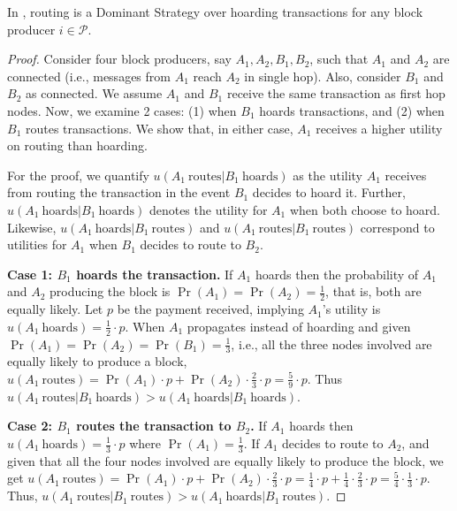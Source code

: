 \begin{lemma}\label{lemma:routing}
    In \ourTFM, routing is a Dominant Strategy over hoarding transactions for any block producer $i\in\mathcal{P}$. 
\end{lemma} 
\begin{proof}

    Consider four block producers, say $A_{1}, A_{2}, B_{1}, B_{2}$, such that $A_{1}$ and $A_{2}$ are connected (i.e., messages from $A_{1}$ reach $A_{2}$ in single hop). Also, consider $B_{1}$ and $B_{2}$ as connected. We assume $A_1$ and $B_1$ receive the same transaction as first hop nodes. Now, we examine 2 cases: (1) when $B_{1}$ hoards transactions, and (2) when $B_{1}$ routes transactions. We show that, in either case, $A_{1}$ receives a higher utility on routing than hoarding.
    
    For the proof, we quantify $u(A_1\ \mbox{routes} | B_1\ \mbox{hoards})$ as the utility $A_1$ receives from routing the transaction in the event $B_1$ decides to hoard it. Further, $u(A_1\ \mbox{hoards} | B_1\ \mbox{hoards})$ denotes the utility for $A_1$ when both choose to hoard. Likewise, $u(A_1\ \mbox{hoards} | B_1\ \mbox{routes})$ and $u(A_1\ \mbox{routes} | B_1\ \mbox{routes})$ correspond to utilities for $A_1$  when $B_1$ decides to route to $B_2$.
    \smallskip

    \noindent \textbf{Case 1: $B_1$ hoards the transaction.} If $A_1$ hoards then the probability of $A_1$ and $A_2$ producing the block is $\Pr(A_1) = \Pr(A_2) = \frac{1}{2}$, that is, both are equally likely. Let $p$ be the payment received, implying $A_1$'s utility is $u(A_1\ \mbox{hoards}) = \frac{1}{2}\cdot p$. When $A_1$ propagates instead of hoarding and given $\Pr(A_1) = \Pr(A_2) = \Pr(B_1) = \frac{1}{3}$, i.e., all the three nodes involved are equally likely to produce a block, $u(A_1 \ \mbox{routes}) = \Pr(A_1) \cdot p + \Pr(A_2) \cdot \frac{2}{3} \cdot p = \frac{5}{9} \cdot p $. Thus $u(A_1\ \mbox{routes} | B_1\ \mbox{hoards}) > u(A_1\ \mbox{hoards} | B_1\ \mbox{hoards})$.

   \smallskip
    \noindent \textbf{Case 2: $B_1$ routes the transaction to $B_2$.} If $A_1$ hoards then $u(A_1\ \mbox{hoards}) = \frac{1}{3} \cdot p$ where $\Pr(A_1) = \frac{1}{3}$. If $A_1$ decides to route to $A_2$, and given that all the four nodes involved are equally likely to produce the block, we get  $u(A_1\ \mbox{routes}) = \Pr(A_1) \cdot p + \Pr(A_2) \cdot \frac{2}{3} \cdot p  = \frac{1}{4} \cdot p + \frac{1}{4} \cdot \frac{2}{3} \cdot p = \frac{5}{4} \cdot \frac{1}{3} \cdot p$. Thus, $u(A_1\ \mbox{routes} | B_1\ \mbox{routes}) > u(A_1\ \mbox{hoards} | B_1\ \mbox{routes})$.
\end{proof}

